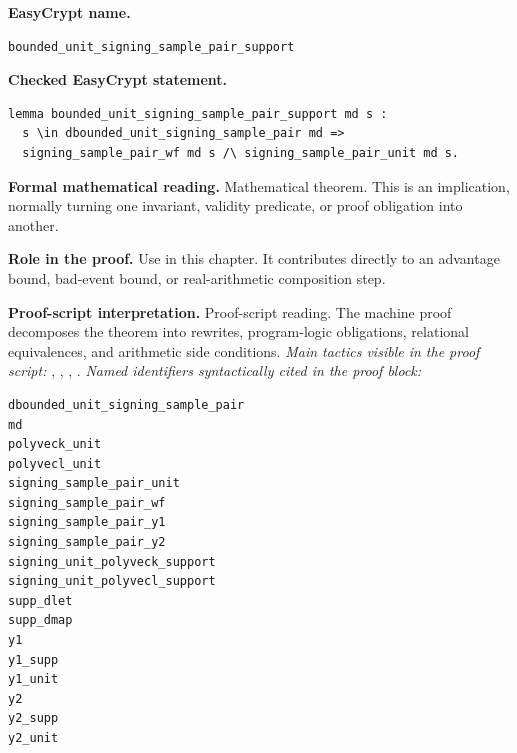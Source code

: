 \begin{formaltheorem}
\noindent\textbf{EasyCrypt name.}
\begin{lstlisting}[language=EasyCrypt,basicstyle=\ttfamily\scriptsize]
bounded_unit_signing_sample_pair_support
\end{lstlisting}
\noindent\textbf{Checked EasyCrypt statement.}
\begin{lstlisting}[language=EasyCrypt,basicstyle=\ttfamily\scriptsize]
lemma bounded_unit_signing_sample_pair_support md s :
  s \in dbounded_unit_signing_sample_pair md =>
  signing_sample_pair_wf md s /\ signing_sample_pair_unit md s.
\end{lstlisting}
\noindent\textbf{Formal mathematical reading.}
Mathematical theorem. This is an implication, normally turning one invariant, validity predicate, or proof obligation into another.

\noindent\textbf{Role in the proof.}
Use in this chapter. It contributes directly to an advantage bound, bad-event bound, or real-arithmetic composition step.

\noindent\textbf{Proof-script interpretation.}
Proof-script reading. The machine proof decomposes the theorem into rewrites, program-logic obligations, relational equivalences, and arithmetic side conditions.
\emph{Main tactics visible in the proof script:} , , , .
\emph{Named identifiers syntactically cited in the proof block:}
\begin{lstlisting}[language=EasyCrypt,basicstyle=\ttfamily\scriptsize]
dbounded_unit_signing_sample_pair
md
polyveck_unit
polyvecl_unit
signing_sample_pair_unit
signing_sample_pair_wf
signing_sample_pair_y1
signing_sample_pair_y2
signing_unit_polyveck_support
signing_unit_polyvecl_support
supp_dlet
supp_dmap
y1
y1_supp
y1_unit
y2
y2_supp
y2_unit
\end{lstlisting}

\end{formaltheorem}

